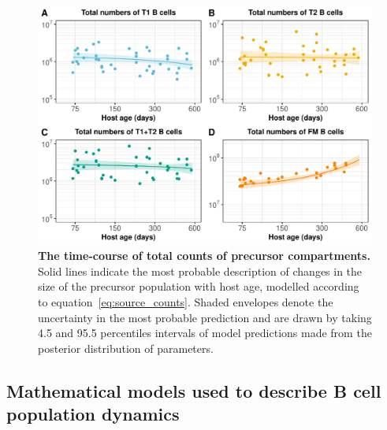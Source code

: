 \documentclass[11pt]{article}
\begin{document}
\begin{figure}[htbp]
	\centerline{\includegraphics[scale = 0.85] {SI_source_counts.pdf}}
	\caption{ \textbf{The time-course of total counts of precursor compartments.} Solid lines indicate the most probable description of changes in the size of the precursor population with host age, modelled according to equation~\ref{eq:source_counts}. Shaded envelopes denote the uncertainty in the most probable prediction and are drawn by taking 4.5 and 95.5 percentiles intervals of model predictions made from the posterior distribution of parameters.}
	\label{fig:source_counts}
\end{figure}
\clearpage


\subsection{Mathematical models used to describe B cell population dynamics} $\label{models}$
\vspace{-1cm}
\end{document}

